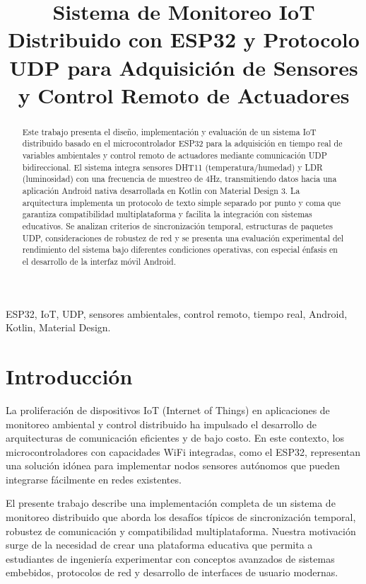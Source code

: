 \documentclass[conference,a4paper]{IEEEtran}
\title{Sistema de Monitoreo IoT Distribuido con ESP32 y Protocolo UDP para Adquisici\'on de Sensores y Control Remoto de Actuadores}
\author{%
\IEEEauthorblockN{Daniel Garcia Araque}
\IEEEauthorblockA{\textit{Universidad Militar Nueva Granada} \\
\textit{Facultad de Ingenier\'ia} \\
est.daniel.garciaa@unimilitar.edu.co}
}
\begin{document}
\maketitle

\begin{abstract}
Este trabajo presenta el dise\~{n}o, implementaci\'on y evaluaci\'on de un sistema IoT distribuido basado en el microcontrolador ESP32 para la adquisici\'on en tiempo real de variables ambientales y control remoto de actuadores mediante comunicaci\'on UDP bidireccional. El sistema integra sensores DHT11 (temperatura/humedad) y LDR (luminosidad) con una frecuencia de muestreo de 4Hz, transmitiendo datos hacia una aplicaci\'on Android nativa desarrollada en Kotlin con Material Design 3. La arquitectura implementa un protocolo de texto simple separado por punto y coma que garantiza compatibilidad multiplataforma y facilita la integraci\'on con sistemas educativos. Se analizan criterios de sincronizaci\'on temporal, estructuras de paquetes UDP, consideraciones de robustez de red y se presenta una evaluaci\'on experimental del rendimiento del sistema bajo diferentes condiciones operativas, con especial \'enfasis en el desarrollo de la interfaz m\'ovil Android.
\end{abstract}

\begin{IEEEkeywords}
ESP32, IoT, UDP, sensores ambientales, control remoto, tiempo real, Android, Kotlin, Material Design.
\end{IEEEkeywords}

\section{Introducci\'on}

La proliferaci\'on de dispositivos IoT (Internet of Things) en aplicaciones de monitoreo ambiental y control distribuido ha impulsado el desarrollo de arquitecturas de comunicaci\'on eficientes y de bajo costo. En este contexto, los microcontroladores con capacidades WiFi integradas, como el ESP32, representan una soluci\'on id\'onea para implementar nodos sensores aut\'onomos que pueden integrarse f\'acilmente en redes existentes.

El presente trabajo describe una implementaci\'on completa de un sistema de monitoreo distribuido que aborda los desaf\'ios t\'ipicos de sincronizaci\'on temporal, robustez de comunicaci\'on y compatibilidad multiplataforma. Nuestra motivaci\'on surge de la necesidad de crear una plataforma educativa que permita a estudiantes de ingenier\'ia experimentar con conceptos avanzados de sistemas embebidos, protocolos de red y desarrollo de interfaces de usuario modernas.
\end{document}
